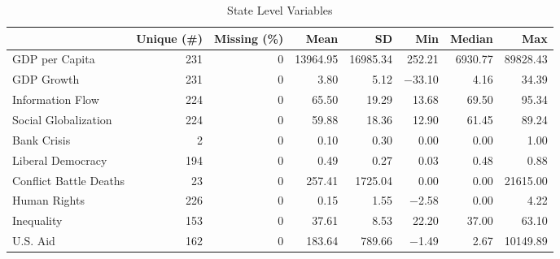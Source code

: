 \begin{table}

\caption{State Level Variables}
\centering
\begin{tabular}[t]{lrrrrrrr}
\toprule
  & Unique (\#) & Missing (\%) & Mean & SD & Min & Median & Max\\
\midrule
GDP per Capita & 231 & 0 & \num{13964.95} & \num{16985.34} & \num{252.21} & \num{6930.77} & \num{89828.43}\\
GDP Growth & 231 & 0 & \num{3.80} & \num{5.12} & \num{-33.10} & \num{4.16} & \num{34.39}\\
Information Flow & 224 & 0 & \num{65.50} & \num{19.29} & \num{13.68} & \num{69.50} & \num{95.34}\\
Social Globalization & 224 & 0 & \num{59.88} & \num{18.36} & \num{12.90} & \num{61.45} & \num{89.24}\\
Bank Crisis & 2 & 0 & \num{0.10} & \num{0.30} & \num{0.00} & \num{0.00} & \num{1.00}\\
Liberal Democracy & 194 & 0 & \num{0.49} & \num{0.27} & \num{0.03} & \num{0.48} & \num{0.88}\\
Conflict Battle Deaths & 23 & 0 & \num{257.41} & \num{1725.04} & \num{0.00} & \num{0.00} & \num{21615.00}\\
Human Rights & 226 & 0 & \num{0.15} & \num{1.55} & \num{-2.58} & \num{0.00} & \num{4.22}\\
Inequality & 153 & 0 & \num{37.61} & \num{8.53} & \num{22.20} & \num{37.00} & \num{63.10}\\
U.S. Aid & 162 & 0 & \num{183.64} & \num{789.66} & \num{-1.49} & \num{2.67} & \num{10149.89}\\
\bottomrule
\end{tabular}
\end{table}
